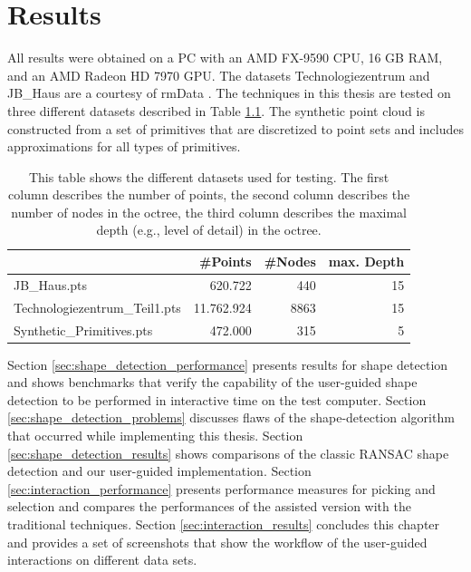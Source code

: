 \chapter{Results}
\label{chap:results}

All results were obtained on a PC with an AMD FX-9590 CPU, 16 GB RAM, and an AMD Radeon HD 7970 GPU. The datasets Technologiezentrum and JB\_Haus are a courtesy of rmData \cite{rmdata}. The techniques in this thesis are tested on three different datasets described in Table \ref{tab:datasets}. The synthetic point cloud is constructed from a set of primitives that are discretized to point sets and includes approximations for all types of primitives. 

\begin{table}
\centering
\begin{tabular}{ l | r | r | r }
                        & \textbf{\#Points} & \textbf{\#Nodes}    & \textbf{max. Depth} \\
    \hline
  JB\_Haus.pts                  & 620.722           & 440   & 15 \\
  Technologiezentrum\_Teil1.pts    & 11.762.924        & 8863  & 15 \\
  Synthetic\_Primitives.pts     & 472.000           & 315   & 5 \\
\end{tabular}
\caption[Table of point-cloud datasets]
{This table shows the different datasets used for testing. The first column describes the number of points, the second column describes the number of nodes in the octree, the third column describes the maximal depth (e.g., level of detail) in the octree. } 
\label{tab:datasets}
\end{table}


Section \ref{sec:shape_detection_performance} presents results for shape detection and shows benchmarks that verify the capability of the user-guided shape detection to be performed in interactive time on the test computer.
Section \ref{sec:shape_detection_problems} discusses flaws of the shape-detection algorithm that occurred while implementing this thesis.
Section \ref{sec:shape_detection_results} shows comparisons of the classic RANSAC shape detection and our user-guided implementation. 
Section \ref{sec:interaction_performance} presents performance measures for picking and selection and compares the performances of the assisted version with the traditional techniques. 
Section \ref{sec:interaction_results} concludes this chapter and provides a set of screenshots that show the workflow of the user-guided interactions on different data sets. 


